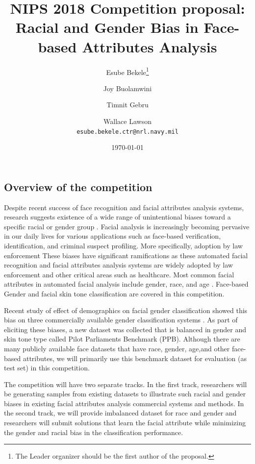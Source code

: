 \documentclass[11pt, oneside]{article}
\title{NIPS 2018 Competition proposal: Racial and Gender Bias in Face-based Attributes Analysis}
\author{Esube Bekele\thanks{The Leader organizer should be the first author of the proposal.} \and Joy Buolamwini \and Timnit Gebru \and Wallace Lawson 
    \\
{\tt esube.bekele.ctr@nrl.navy.mil}\\
}
\date{\today}
\makeatletter
\let\@internalcite\cite
\def\cite{\def\citeauthoryear##1##2{##1, ##2}\@internalcite}
\makeatother
\begin{document}
\maketitle

\subsection{Overview of the competition}

Despite recent success of face recognition and facial attributes  analysis systems, research suggests existence of a wide range of unintentional biases toward a specific racial or gender group \cite{phillips2011other} \cite{klare2012face}. Facial analysis is increasingly becoming pervasive in our daily lives for various applications such as face-based verification, identification, and criminal suspect profiling. More specifically, adoption by  law enforcement These biases have significant ramifications as these automated facial recognition and facial attributes analysis systems are widely adopted by law enforcement and other critical areas such as healthcare. Most common facial attributes in automated facial analysis include gender, race, and age \cite{fu2014learning} \cite{ng2015review} \cite{han2015demographic}. Face-based Gender and facial skin tone classification are covered in this competition.

Recent study of effect of demographics on facial gender classification showed this bias on three commercially available gender classification systems \cite{buolamwini2018gender}. As part of eliciting these biases, a new dataset was collected that is balanced in gender and skin tone type called Pilot Parliaments Benchmark (PPB). Although there are many publicly available face datasets that have race, gender, age,and other face-based attributes, we will primarily use this benchmark dataset for evaluation (as test set) in this competition.

The competition will have two separate tracks. In the first track, researchers will be generating samples from existing datasets to illustrate such racial and gender biases in existing facial attributes analysis commercial systems and methods. In the second track, we will provide imbalanced dataset for race and gender and researchers will submit solutions that learn the facial attribute while minimizing the gender and racial bias in the classification performance.
\end{document}
